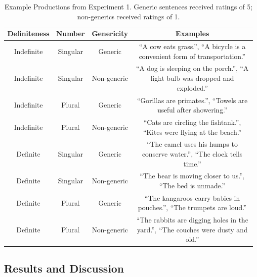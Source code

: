 \documentclass[10pt,letterpaper]{article}
\begin{document}
\begin{table}
\begin{center} 
\caption{Example Productions from Experiment 1. Generic sentences received ratings of 5; non-generics received ratings of 1.} 
\label{sample-table} 
\vskip 0.12in
\begin{tabular}{cccc} 
\hline
Definiteness    &  Number & Genericity & Examples \\
\hline
Indefinite        &   Singular & Generic & ``A cow eats grass.'', ``A bicycle is a convenient form of transportation.''\\
Indefinite  &   Singular & Non-generic & ``A dog is sleeping on the porch.'', ``A light bulb was dropped and exploded.''\\
Indefinite           &   Plural & Generic & ``Gorillas are primates.'', ``Towels are useful after showering.''\\
Indefinite         &   Plural  & Non-generic & ``Cats are circling the fishtank.'', ``Kites were flying at the beach.''\\
Definite        &   Singular & Generic & ``The camel uses his humps to conserve water.'', ``The clock tells time.''  \\
Definite  &   Singular & Non-generic & ``The bear is moving closer to us.'', ``The bed is unmade.''\\
Definite           &   Plural & Generic & ``The kangaroos carry babies in pouches.'', ``The trumpets are loud.'' \\
Definite         &   Plural & Non-generic & ``The rabbits are digging holes in the yard.'', ``The couches were dusty and old.''\\
\hline
\end{tabular} 
\end{center} 
\end{table}

\subsection{Results and Discussion}
\end{document}
